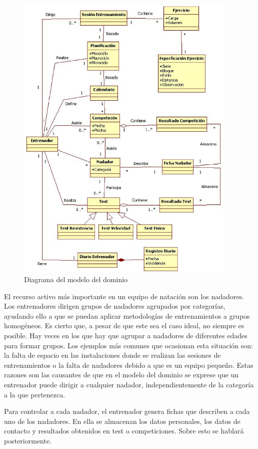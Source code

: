 	\begin{figure}
	  \centering
	    \includegraphics[width=400px]{./eps/captreq_modelo_dominio.eps}
	  \caption{Diagrama del modelo del dominio}
	  \label{fig:modelo_dominio}
	\end{figure}
	
	El recurso activo más importante en un equipo de natación son los nadadores. Los entrenadores dirigen grupos de nadadores agrupados por categorías, ayudando ello a que se puedan aplicar metodologías de entrenamientos a grupos homogéneos. Es cierto que, a pesar de que este sea el caso ideal, no siempre es posible. Hay veces en los que hay que agrupar a nadadores de diferentes edades para formar grupos. Los ejemplos más comunes que ocasionan esta situación son: la falta de espacio en las instalaciones donde se realizan las sesiones de entrenamientos o la falta de nadadores debido a que es un equipo pequeño. Estas razones son las causantes de que en el modelo del dominio se exprese que un entrenador puede dirigir a cualquier nadador, independientemente de la categoría a la que pertenezca.
	
	Para controlar a cada nadador, el entrenador genera fichas que describen a cada uno de los nadadores. En ella se almacenan los datos personales, los datos de contacto y resultados obtenidos en test o competiciones. Sobre esto se hablará posteriormente.
	
